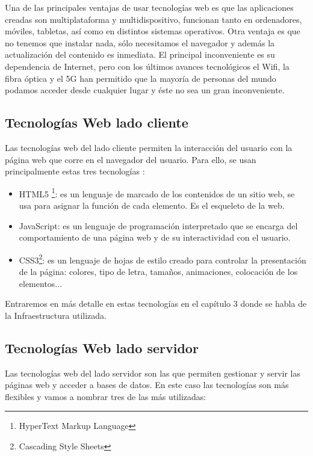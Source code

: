 Una de las principales ventajas de usar tecnologías web es que las aplicaciones creadas son multiplataforma y multidispositivo, funcionan tanto en ordenadores, móviles, tabletas, así como en distintos sistemas operativos. Otra ventaja es que no tenemos que instalar nada, sólo necesitamos el navegador y además la actualización del contenido es inmediata. El principal inconveniente es su dependencia de Internet, pero con los últimos avances tecnológicos el Wifi, la fibra óptica y el 5G han permitido que la mayoría de personas del mundo podamos acceder desde cualquier lugar y éste no sea un gran inconveniente.


\subsection{Tecnologías Web lado cliente}
Las tecnologías web del lado cliente  permiten la interacción del usuario con la página web que corre en el navegador del usuario. Para ello, se usan principalmente estas tres tecnologías \cite{tecnologiascliente}:

\begin{itemize}
  \item HTML5 \footnote{HyperText Markup Language}: es un lenguaje de marcado de los contenidos de un sitio web, se usa para asignar la función de cada elemento. Es el esqueleto de la web.
  \item JavaScript: es un lenguaje de programación interpretado que se encarga del comportamiento de una página web y de su interactividad con el usuario.
  \item CSS3\footnote{Cascading Style Sheets}: es un lenguaje de hojas de estilo creado para controlar la presentación de la página: colores, tipo de letra, tamaños, animaciones, colocación de los elementos...
\end{itemize}

Entraremos en más detalle en estas tecnologías en el capítulo 3 donde se habla de la Infraestructura utilizada.

\newpage
\subsection{Tecnologías Web lado servidor}
Las tecnologías web del lado servidor son las que permiten gestionar y servir las páginas web y acceder a bases de datos. En este caso las tecnologías son más flexibles y vamos a nombrar tres de las más utilizadas:

